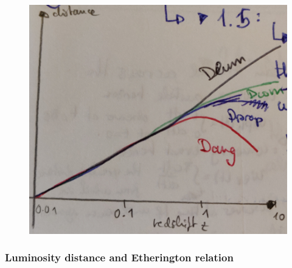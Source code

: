 \begin{figure}[h!]
	\centering
	\includegraphics[width=0.7\linewidth]{gfx/DistancemeasuresCompared}
	\caption{}
	\label{fig:distancemeasurescompared}
\end{figure}

\subsubsection{Luminosity distance and Etherington relation}


